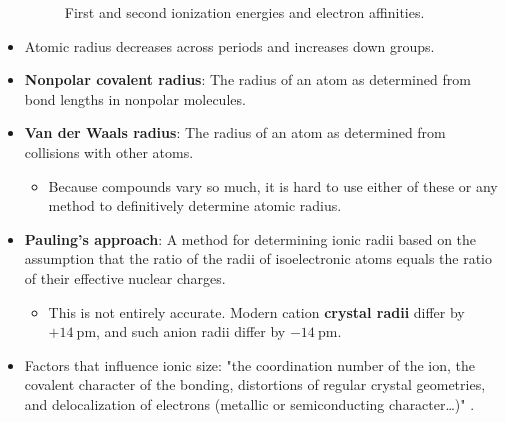 \documentclass[../notes.tex]{subfiles}
\begin{document}
\begin{itemize}
\begin{figure}[h!]
        \caption{First and second ionization energies and electron affinities.}
        \label{fig:IE-EA}
    \end{figure}
    \item Atomic radius decreases across periods and increases down groups.
    \item \textbf{Nonpolar covalent radius}: The radius of an atom as determined from bond lengths in nonpolar molecules.
    \item \textbf{Van der Waals radius}: The radius of an atom as determined from collisions with other atoms.
    \begin{itemize}
        \item Because compounds vary so much, it is hard to use either of these or any method to definitively determine atomic radius.
    \end{itemize}
    \item \textbf{Pauling's approach}: A method for determining ionic radii based on the assumption that the ratio of the radii of isoelectronic atoms equals the ratio of their effective nuclear charges.
    \begin{itemize}
        \item This is not entirely accurate. Modern cation \textbf{crystal radii} differ by $+\SI{14}{\pico\meter}$, and such anion radii differ by $-\SI{14}{\pico\meter}$.
    \end{itemize}
    \item Factors that influence ionic size: "the coordination number of the ion, the covalent character of the bonding, distortions of regular crystal geometries, and delocalization of electrons (metallic or semiconducting character\dots)" \parencite[40]{bib:MiesslerFischerTarr}.
\end{itemize}
\end{document}
